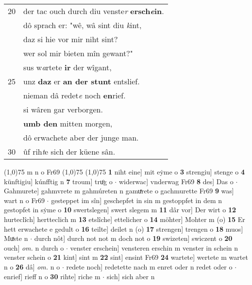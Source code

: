 \documentclass[8pt,a4paper,notitlepage]{article}
\begin{document}
\begin{table}[ht]
\begin{minipage}[t]{0.5\linewidth}
\begin{tabular}{rl}
20 & der tac ouch durch diu venste\textit{r} \textbf{ersch\textit{e}in}.\\ 
 & dô sprach er: "wê, wâ sint diu \textit{k}int,\\ 
 & daz si hie vor mir niht sint?\\ 
 & wer sol mir bieten mîn gewant?"\\ 
 & sus w\textit{a}rtete \textbf{ir} der wîgant,\\ 
25 & unz \textbf{daz} er \textbf{an der stunt} entslief.\\ 
 & nieman dâ redet\textit{e} noch \textbf{en}rief.\\ 
 & si wâren gar verborgen.\\ 
 & \textbf{umb den} mitten morgen,\\ 
 & dô erwachete aber der junge man.\\ 
30 & ûf rih\textit{t}e sich der küene sân.\\ 
\end{tabular}
\scriptsize
\line(1,0){75} \newline
m n o Fr69 \newline
\line(1,0){75} \newline
\newline
\line(1,0){75} \newline
\textbf{1} niht eine] mit eẏme o \textbf{3} strengiu] stenge o \textbf{4} künftigiu] kúnfftig n \textbf{7} troum] truͦg o  $\cdot$ widerwac] vnderwag Fr69 \textbf{8} des] Das o  $\cdot$ Gahmurete] gahmvrete m gahmúreten n gamuͯrete o gachmurette Fr69 \textbf{9} was] wart n o Fr69  $\cdot$ gesteppet im sîn] geschepfet in sin m gestoppfet in dem n gestopfet in sẏme o \textbf{10} swertslegen] swert slegem m \textbf{11} dâr vor] Der wirt o \textbf{12} hurteclîch] hertteclich m \textbf{13} etslîche] ettelicher o \textbf{14} möhter] Mohter m (o) \textbf{15} Er hett erwachete e gedult o \textbf{16} teilte] deilet n (o) \textbf{17} strengen] trengen o \textbf{18} muos] Muͯste n  $\cdot$ durch nôt] durch not not m doch not o \textbf{19} swizeten] swiczent o \textbf{20} ouch] \textit{om.} n durch o  $\cdot$ venster erschein] vensteren erschin m venster in schein n venster schein o \textbf{21} kint] sint m \textbf{22} sint] ensint Fr69 \textbf{24} wartete] wertete m wartet n o \textbf{26} dâ] \textit{om.} n o  $\cdot$ redete noch] redetette nach m enret oder n redet oder o  $\cdot$ enrief] rieff n o \textbf{30} rihte] riche m  $\cdot$ sich] sich aber n \newline
\end{minipage}
\end{table}
\end{document}
